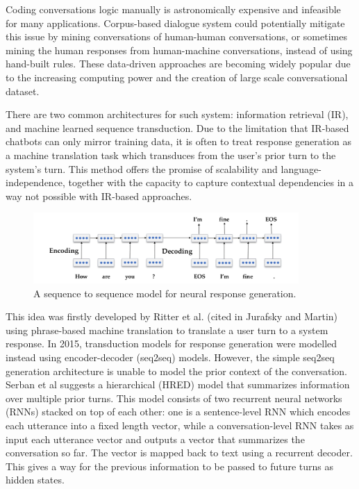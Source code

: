 \documentclass[bsc,frontabs,twoside,singlespacing,parskip,deptreport]{infthesis}     %
\begin{document}
Coding conversations logic manually is astronomically expensive and infeasible for many applications. Corpus-based dialogue system could potentially mitigate this issue by mining conversations of human-human conversations, or sometimes mining the human responses from human-machine conversations, instead of using hand-built rules. These data-driven approaches are becoming widely popular due to the increasing computing power and the creation of large scale conversational dataset. 

There are two common architectures for such system:  information retrieval (IR), and machine learned sequence transduction. Due to the limitation that IR-based chatbots can only mirror training data, it is often to treat response generation as a machine translation task which transduces from the user’s prior turn to the system’s turn. This method offers the promise of scalability and language-independence, together with the capacity to capture contextual dependencies in a way not possible with IR-based approaches.

\begin{figure}[h]
    \centering
    \includegraphics[width=0.9\textwidth]{seq2seq.jpeg}
    \caption{A sequence to sequence model for neural response generation.\cite{jurafsky2019speech}}
    \label{fig:seq2seq}
\end{figure}

This idea was firstly developed by Ritter et al\cite{ritter2011data}. (cited in Jurafsky and Martin\cite{jurafsky2019speech}) using phrase-based machine translation to translate a user turn to a system response. In 2015, transduction models for response generation were modelled instead using encoder-decoder (seq2seq) models\cite{shang2015neural,strub2017end,sordoni2015neural}. However, the simple seq2seq generation architecture is unable to model the prior context of the conversation. Serban et al\cite{serban2016building} suggests a hierarchical (HRED) model that summarizes information over multiple prior turns. This model consists of two recurrent neural networks (RNNs) stacked on top of each other: one is a sentence-level RNN which encodes each utterance into a fixed length vector, while a conversation-level RNN takes as input each utterance vector and outputs a vector that summarizes the conversation so far. The vector is mapped back to text using a recurrent decoder. This gives a way for the previous information to be passed to future turns as hidden states\cite{lowe2017training}.
\end{document}
